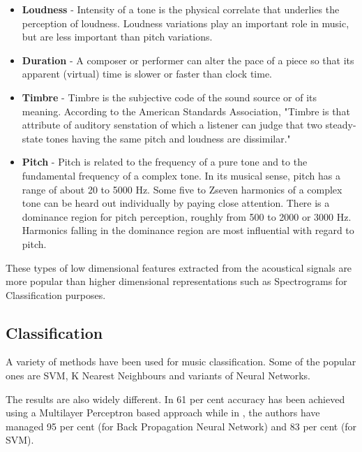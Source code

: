 \begin{itemize}
        \item \textbf{Loudness} - Intensity of a tone is the physical correlate that underlies the perception of loudness. Loudness variations play an important role in music, but are less important than pitch variations.

        \item \textbf{Duration} - A composer or performer can alter the pace of a piece so that its apparent (virtual) time is slower or faster than clock time. 

        \item \textbf{Timbre} - Timbre is the subjective code of the sound source or of its meaning. According to the American Standards Association, "Timbre
                is that attribute of auditory senstation of which a listener can judge that two steady-state tones having the same pitch and loudness are dissimilar."

        \item \textbf{Pitch} - Pitch is related to the frequency of a pure tone and to the fundamental frequency of a complex tone. In its musical sense, pitch
                has a range of about 20 to 5000 Hz. Some five to Zseven harmonics of a complex tone can be heard out individually by paying close attention. There
                is a dominance region for pitch perception, roughly from 500 to 2000 or 3000 Hz. Harmonics falling in the dominance region are most influential 
                with regard to pitch.

\end{itemize}

These types of low dimensional features extracted from the acoustical signals are more popular than higher dimensional representations such as
Spectrograms for Classification purposes. \cite{prasad2007}

\subsection{Classification}

A variety of methods have been used for music classification. Some of the popular ones are SVM, K Nearest Neighbours and variants of Neural Networks.

The results are also widely different. In \cite{Neumayer2004} 61 per cent accuracy has been achieved using a Multilayer Perceptron based approach while
in \cite{Kour2015}, the authors have managed 95 per cent (for Back Propagation Neural Network) and 83 per cent (for SVM).

